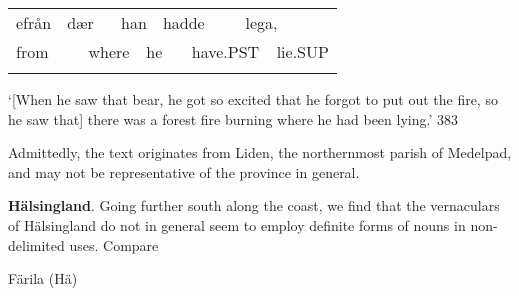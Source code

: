 \begin{tabular}{llllllllll}
\lsptoprule
efrån & \multicolumn{2}{l}{dær

} & \multicolumn{2}{l}{han

} & \multicolumn{2}{l}{hadde

} & \multicolumn{2}{l}{lega,

} & \\
\multicolumn{2}{l}{from

} & \multicolumn{2}{l}{where

} & \multicolumn{2}{l}{he 

} & \multicolumn{2}{l}{have.PST

} & \multicolumn{2}{l}{lie.SUP

}\\
\lspbottomrule
\end{tabular}

\begin{styleTranslation}
 ‘[When he saw that bear, he got so excited that he forgot to put out the fire, so he saw that] there was a forest fire burning where he had been lying.’ 383

\end{styleTranslation}

\begin{styleBodyTextFirst}
Admittedly, the text originates from Liden, the northernmost parish of Medelpad, and may not be representative of the province in general. 

\end{styleBodyTextFirst}

\begin{styleBodytextC}
\textbf{Hälsingland}. Going further south along the coast, we find that the vernaculars of Hälsingland do not in general seem to employ definite forms of nouns in non-delimited uses. Compare 

\end{styleBodytextC}

\begin{listWWNumileveli}
\item 

\begin{styleExample}
Färila (Hä)

\end{styleExample}

\end{listWWNumileveli}

